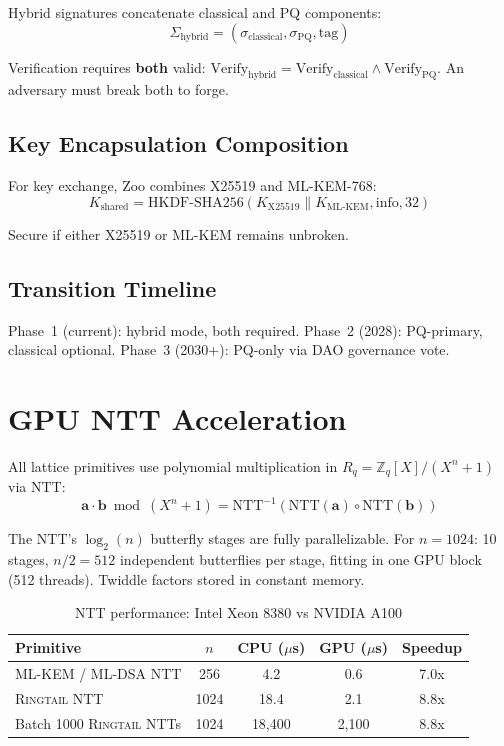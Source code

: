 \documentclass[11pt,letterpaper]{article}
\theoremstyle{definition}
\theoremstyle{remark}
\newcommand{\Ringtail}{\textsc{Ringtail}}
\newcommand{\MLKEM}{\textsc{ML-KEM}}
\newcommand{\MLDSA}{\textsc{ML-DSA}}
\begin{document}
Hybrid signatures concatenate classical and PQ components:
\begin{equation}
\Sigma_{\text{hybrid}} = (\sigma_{\text{classical}}, \sigma_{\text{PQ}}, \text{tag})
\end{equation}

Verification requires \textbf{both} valid: $\text{Verify}_{\text{hybrid}} = \text{Verify}_{\text{classical}} \wedge \text{Verify}_{\text{PQ}}$. An adversary must break both to forge.

\subsection{Key Encapsulation Composition}

For key exchange, Zoo combines X25519 and \MLKEM{}-768:
\begin{equation}
K_{\text{shared}} = \text{HKDF-SHA256}(K_{\text{X25519}} \| K_{\text{ML-KEM}}, \text{info}, 32)
\end{equation}

Secure if either X25519 or \MLKEM{} remains unbroken.

\subsection{Transition Timeline}

Phase~1 (current): hybrid mode, both required. Phase~2 (2028): PQ-primary, classical optional. Phase~3 (2030+): PQ-only via DAO governance vote.

\section{GPU NTT Acceleration}

All lattice primitives use polynomial multiplication in $R_q = \mathbb{Z}_q[X]/(X^n + 1)$ via NTT:
\begin{equation}
\mathbf{a} \cdot \mathbf{b} \bmod (X^n + 1) = \text{NTT}^{-1}(\text{NTT}(\mathbf{a}) \circ \text{NTT}(\mathbf{b}))
\end{equation}

The NTT's $\log_2(n)$ butterfly stages are fully parallelizable. For $n = 1024$: 10 stages, $n/2 = 512$ independent butterflies per stage, fitting in one GPU block (512 threads). Twiddle factors stored in constant memory.

\begin{table}[h]
\centering
\begin{tabular}{lcccc}
\toprule
\textbf{Primitive} & \textbf{$n$} & \textbf{CPU ($\mu$s)} & \textbf{GPU ($\mu$s)} & \textbf{Speedup} \\
\midrule
\MLKEM{} / \MLDSA{} NTT & 256 & 4.2 & 0.6 & 7.0x \\
\Ringtail{} NTT & 1024 & 18.4 & 2.1 & 8.8x \\
Batch 1000 \Ringtail{} NTTs & 1024 & 18,400 & 2,100 & 8.8x \\
\bottomrule
\end{tabular}
\caption{NTT performance: Intel Xeon 8380 vs NVIDIA A100}
\label{tab:ntt-perf}
\end{table}
\end{document}

